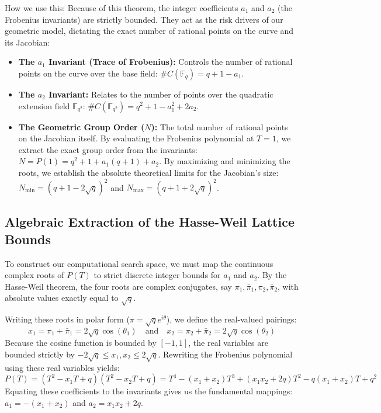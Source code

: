 \documentclass[letterpaper, 11pt]{article}
\begin{document}
How we use this: Because of this theorem, the integer coefficients $a_1$ and $a_2$ (the Frobenius invariants) are strictly bounded. They act as the risk drivers of our geometric model, dictating the exact number of rational points on the curve and its Jacobian:
\begin{itemize}
    \item \textbf{The $a_1$ Invariant (Trace of Frobenius):} Controls the number of rational points on the curve over the base field: $\#C(\mathbb{F}_q) = q + 1 - a_1$.
    \item \textbf{The $a_2$ Invariant:} Relates to the number of points over the quadratic extension field $\mathbb{F}_{q^2}$: $\#C(\mathbb{F}_{q^2}) = q^2 + 1 - a_1^2 + 2a_2$.
    \item \textbf{The Geometric Group Order ($N$):} The total number of rational points on the Jacobian itself. By evaluating the Frobenius polynomial at $T=1$, we extract the exact group order from the invariants: $N = P(1) = q^2 + 1 + a_1(q + 1) + a_2$. By maximizing and minimizing the roots, we establish the absolute theoretical limits for the Jacobian's size: $N_{\text{min}} = (q + 1 - 2\sqrt{q})^2$ and $N_{\text{max}} = (q + 1 + 2\sqrt{q})^2$.
\end{itemize}

\subsection{Algebraic Extraction of the Hasse-Weil Lattice Bounds}
To construct our computational search space, we must map the continuous complex roots of $P(T)$ to strict discrete integer bounds for $a_1$ and $a_2$. By the Hasse-Weil theorem, the four roots are complex conjugates, say $\pi_1, \bar{\pi}_1, \pi_2, \bar{\pi}_2$, with absolute values exactly equal to $\sqrt{q}$. 

Writing these roots in polar form ($\pi = \sqrt{q}e^{i\theta}$), we define the real-valued pairings:
\[ x_1 = \pi_1 + \bar{\pi}_1 = 2\sqrt{q}\cos(\theta_1) \quad \text{and} \quad x_2 = \pi_2 + \bar{\pi}_2 = 2\sqrt{q}\cos(\theta_2) \]
Because the cosine function is bounded by $[-1, 1]$, the real variables are bounded strictly by $-2\sqrt{q} \le x_1, x_2 \le 2\sqrt{q}$. Rewriting the Frobenius polynomial using these real variables yields:
\[ P(T) = (T^2 - x_1 T + q)(T^2 - x_2 T + q) = T^4 - (x_1 + x_2)T^3 + (x_1 x_2 + 2q)T^2 - q(x_1 + x_2)T + q^2 \]
Equating these coefficients to the invariants gives us the fundamental mappings: $a_1 = -(x_1 + x_2)$ and $a_2 = x_1 x_2 + 2q$. 
\end{document}
